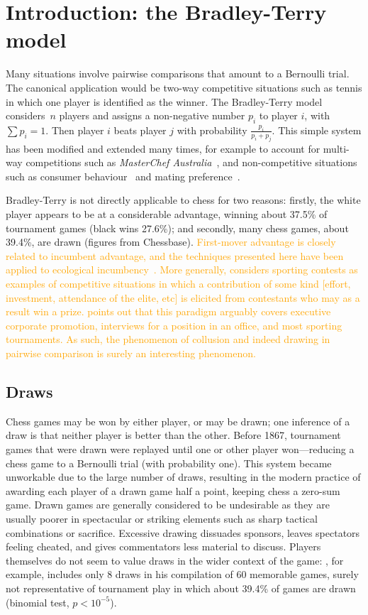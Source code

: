 \documentclass[review]{elsarticle}
\begin{document}
\section{Introduction: the Bradley-Terry model}

Many situations involve pairwise comparisons that amount to a
Bernoulli trial.  The canonical application would be two-way
competitive situations such as tennis in which one player is
identified as the winner.  The Bradley-Terry
model~\citep{bradley1952,turner2012} considers~$n$ players and assigns
a non-negative number $p_i$ to player $i$, with $\sum p_i=1$.  Then
player $i$ beats player $j$ with probability $\frac{p_i}{p_i+p_j}$.
This simple system has been modified and extended many times, for
example to account for multi-way competitions such as {\em MasterChef
  Australia}~\citep{hankin2017}, and non-competitive situations such
as consumer behaviour~\citep{hankin2010} and mating
preference~\citep{west2008}.

Bradley-Terry is not directly applicable to chess for two reasons:
firstly, the white player appears to be at a considerable advantage,
winning about 37.5\% of tournament games (black wins 27.6\%); and
secondly, many chess games, about 39.4\%, are drawn (figures from
Chessbase).  \textcolor{orange}{First-mover advantage is closely
  related to incumbent advantage, and the techniques presented here
  have been applied to ecological incumbency~\cite{hankin2010}.  More
  generally, \cite{szymanski2003} considers sporting contests as
  examples of competitive situations in which a contribution of some
  kind [effort, investment, attendance of the elite, etc] is elicited
  from contestants who may as a result win a prize.
  \citeauthor{szymanski2003} points out that this paradigm arguably
  covers executive corporate promotion, interviews for a position in
  an office, and most sporting tournaments.  As such, the phenomenon
  of collusion and indeed drawing in pairwise comparison is surely an
  interesting phenomenon.}
  
\subsection{Draws} Chess games may be won by either player, or may be
drawn; one inference of a draw is that neither player is better than
the other.  Before 1867, tournament games that were drawn were
replayed until one or other player won---reducing a chess game to a
Bernoulli trial (with probability one).  This system became unworkable
due to the large number of draws, resulting in the modern practice of
awarding each player of a drawn game half a point, keeping chess a
zero-sum game.  Drawn games are generally considered to be undesirable
as they are usually poorer in spectacular or striking elements such as
sharp tactical combinations or sacrifice.  Excessive drawing dissuades
sponsors, leaves spectators feeling cheated, and gives commentators
less material to discuss.  Players themselves do not seem to value
draws in the wider context of the game: \citet{fischer1969},
for example, includes only 8 draws in his compilation of 60 memorable
games, surely not representative of tournament play in which about
39.4\% of games are drawn (binomial test, $p<10^{-5}$).
\end{document}
